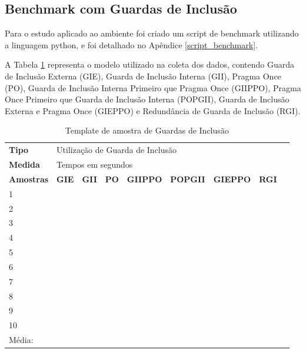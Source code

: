 \subsection{Benchmark com Guardas de Inclusão}\label{Amplicação ao Ambiente}

Para o estudo aplicado ao ambiente foi criado um script de benchmark utilizando
 a linguagem python, e foi detalhado no Apêndice \ref{script_benchmark}.

A Tabela \ref{tab:modelo_guards} representa o modelo utilizado na coleta dos dados,
 contendo Guarda de Inclusão Externa (GIE), Guarda de Inclusão Interna (GII),
 Pragma Once (PO), Guarda de Inclusão Interna Primeiro que Pragma Once (GIIPPO),
 Pragma Once Primeiro que Guarda de Inclusão Interna (POPGII),
 Guarda de Inclusão Externa e Pragma Once (GIEPPO) e
 Redundância de Guarda de Inclusão (RGI).

\begin{table}[!ht]
\centering
\caption{Template de amostra de Guardas de Inclusão}
\label{tab:modelo_guards}
\begin{tiny}
\begin{tabular}{lp{1cm}p{1cm}p{1cm}p{1cm}p{1cm}p{1cm}p{1cm}p{1cm}}
\textbf{Tipo} & \multicolumn{7}{l}{Utilização de Guarda de Inclusão} \\
\textbf{Medida} & \multicolumn{7}{l}{Tempos em segundos } \\
\textbf{Amostras} & \textbf{GIE} & \textbf{GII} & \textbf{PO} & 
\textbf{GIIPPO} & \textbf{POPGII} & \textbf{GIEPPO} & \textbf{RGI} \\ \toprule
 1  &  &  &   &   &   &   &  \\ 
 2  &  &  &   &   &   &   &  \\ 
 3  &  &  &   &   &   &   &  \\ 
 4  &  &  &   &   &   &   &  \\ 
 5  &  &  &   &   &   &   &  \\ 
 6  &  &  &   &   &   &   &  \\ 
 7  &  &  &   &   &   &   &  \\ 
 8  &  &  &   &   &   &   &  \\ 
 9  &  &  &   &   &   &   &  \\ 
 10 &  &  &   &   &   &   &  \\ \bottomrule
 Média: & & & & &   &   &    \\ 
\end{tabular}
\end{tiny}
\end{table}

